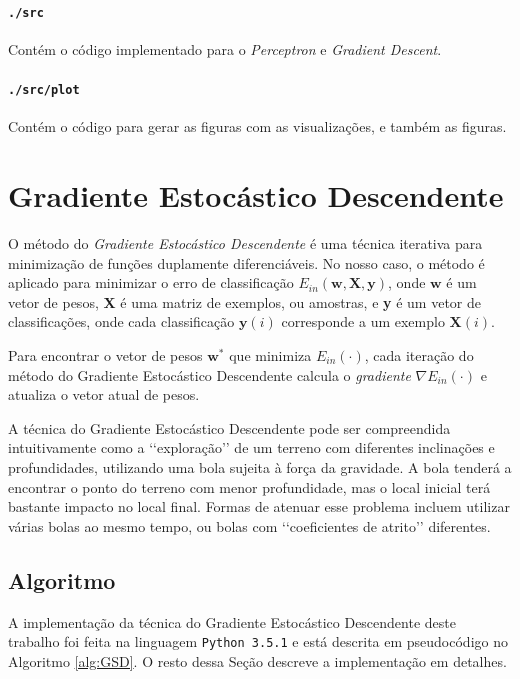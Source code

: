 \documentclass[a4paper, 12pt]{article}
\begin{document}
\paragraph{\texttt{./src}} Contém o código implementado
para o \textit{Perceptron} e \textit{Gradient Descent}.

\paragraph{\texttt{./src/plot}} Contém o código para
gerar as figuras com as visualizações, e também as figuras.

\section{Gradiente Estocástico Descendente}

O método do \textit{Gradiente Estocástico Descendente} é uma técnica iterativa
para minimização de funções duplamente diferenciáveis. No nosso caso, o método
é aplicado para minimizar o erro de classificação $E_{in}(\textbf{w},
\textbf{X}, \textbf{y})$, onde $\textbf{w}$ é um vetor de pesos, \textbf{X} é
uma matriz de exemplos, ou amostras, e \textbf{y} é um vetor de classificações,
onde cada classificação $\textbf{y}(i)$ corresponde a um exemplo
$\textbf{X}(i)$.

Para encontrar o vetor de pesos $\textbf{w}^{*}$ que minimiza $E_{in}(\cdot)$,
cada iteração do método do Gradiente Estocástico Descendente calcula o
\textit{gradiente} $\nabla{}E_{in}(\cdot)$ e atualiza o vetor atual de pesos.

A técnica do Gradiente Estocástico Descendente pode ser compreendida
intuitivamente como a \lq\lq{}exploração\rq\rq{} de um terreno com diferentes
inclinações e profundidades, utilizando uma bola sujeita à força da gravidade.
A bola tenderá a encontrar o ponto do terreno com menor profundidade, mas o
local inicial terá bastante impacto no local final. Formas de atenuar esse
problema incluem utilizar várias bolas ao mesmo tempo, ou bolas com
\lq\lq{}coeficientes de atrito\rq\rq{} diferentes.

\subsection{Algoritmo}

A implementação da técnica do Gradiente Estocástico Descendente deste trabalho
foi feita na linguagem \texttt{Python 3.5.1} e está descrita em pseudocódigo no
Algoritmo \ref{alg:GSD}. O resto dessa Seção descreve a implementação em
detalhes.
\end{document}
